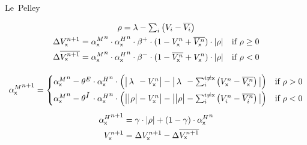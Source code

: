 \documentclass[varwidth]{standalone}
\begin{document}
\newcommand{\eks}{\textsf{x}}
\newcommand{\longlambda}{\rlap{$\,\lambda$}\phantom{\big| \rho \big|}}
\newcommand{\longI}{\rlap{$I$}\phantom{E}}

\begin{center}
	\huge
	\sffamily
	Le~Pelley
\end{center}

\begin{gather*}
	\begin{gathered}
		\rho = \lambda - \textstyle\sum_i \left( V_i - \overline{V_i} \right) \\
		\begin{aligned}
			\Delta V_\eks^{n + 1} &= {\alpha^M_\eks}^n \cdot {\alpha^H_\eks}^n \cdot \beta^+ \cdot (1 - V_\eks^n + \overline{V_\eks^n}) \cdot \left| \rho \right| & \text{if } \rho \geq 0 \\
			 \Delta \overline{V_\eks^{n + 1}} &= {\alpha^M_\eks}^n \cdot {\alpha^H_\eks}^n \cdot \beta^- \cdot (1 - \overline{V_\eks^n} + V_\eks^n) \cdot \left| \rho \right| & \text{if } \rho < 0
		\end{aligned}
	\end{gathered} \\[1em]
	\begin{gathered}
		{\alpha^M_\eks}^{n + 1} =
			\begin{cases}
				{\alpha^M_\eks}^n - \theta^E \cdot {\alpha^H_\eks}^n \cdot \left( \big| \longlambda - V_\eks^n \big| - \big| \longlambda - \textstyle\sum_i^{i \neq \eks} \left( V_\eks^n - \overline{V_\eks^n} \right) \big| \right) & \text{if } \rho > 0 \\[1ex]
				 {\alpha^M_\eks}^n -\theta^{\longI} \cdot {\alpha^H_\eks}^n \cdot \left( \big| \big| \rho \big| - V_\eks^n \big| - \big| \big| \rho \big| - \textstyle\sum_i^{i \neq \eks} \left( V_i^n - \overline{V_i^n} \right) \big| \right) & \text{if } \rho < 0
			\end{cases} \\[1ex]
			\begin{aligned}
				{\alpha^H_\eks}^{n + 1} &= \gamma \cdot \left| \rho \right| + \left( 1 - \gamma \right) \cdot {\alpha^H_\eks}^{n} \\
				V_\eks^{n + 1} &= \Delta V_\eks^{n + 1} - \Delta \overline{V_\eks^{n + 1}}
			\end{aligned}
	\end{gathered}
\end{gather*}
\end{document}
